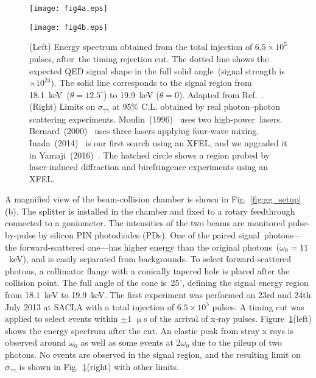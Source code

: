 \documentclass[10pt,a4paper]{article}%
\begin{document}
\begin{figure}[!t]
\begin{minipage}{0.5\hsize}
\centering
\texttt{[image: fig4a.eps]}
\end{minipage}
\begin{minipage}{0.5\hsize}
\vspace{2mm}
\centering
\texttt{[image: fig4b.eps]}
\end{minipage}
\caption{
(Left)
Energy spectrum obtained from the total injection of $6.5\times10^{5}$ pulses, after~the timing rejection cut.
The dotted line shows the expected QED signal shape in the full solid angle~(signal strength is $\times10^{24}$).
The solid line corresponds to the signal region from 18.1~keV~($\theta=12.5^{\circ}$) to 19.9~keV ($\theta=0$).
Adapted from Ref.~\cite{gg1}.
(Right)
Limits on $\sigma_{\gamma\gamma}$ at 95\% C.L. obtained by real photon--photon scattering experiments.
Moulin~(1996)~\cite{moulin} uses two high-power~lasers.
Bernard~(2000)~\cite{bernard} uses three lasers applying four-wave mixing.
Inada~(2014)~\cite{gg1} is our first search using an XFEL, and we upgraded it in Yamaji~(2016)~\cite{gg2}.
The hatched circle shows a region probed by laser-induced diffraction and birefringence experiments using an XFEL.
\label{fig:gg_result}}
\end{figure}   

A magnified view of the beam-collision chamber is shown in Fig.~\ref{fig:gg_setup}(b).
The splitter is installed in the chamber and fixed to a rotary feedthrough connected to a goniometer.
The intensities of the two beams are monitored pulse-by-pulse by silicon PIN photodiodes (PDs).
One of the paired signal~photons---the forward-scattered one---has higher energy than the original photons~($\omega_{0}=11$~keV), and is easily separated from backgrounds.
To select forward-scattered photons, a collimator flange with a 
conically tapered hole is placed after the collision point.
The full angle of the cone is~25$^{\circ}$, defining the signal energy region from 18.1~keV to 19.9~keV.
The first experiment was performed on 23rd and 24th July 2013 at SACLA with a total injection of $6.5\times10^{5}$ pulses.
A timing cut was applied to select events within $\pm 1$ $\upmu$s of the arrival of x-ray pulses.
Figure~\ref{fig:gg_result}(left) shows the energy spectrum after the cut.
An elastic peak from stray x rays is observed around $\omega_{0}$ as well as some events at 2$\omega_{0}$ due to the pileup of two photons.
No events are observed in the signal region, and the resulting limit on $\sigma_{\gamma \gamma}$ is shown in Fig.~\ref{fig:gg_result}(right) with other limits.
\end{document}
